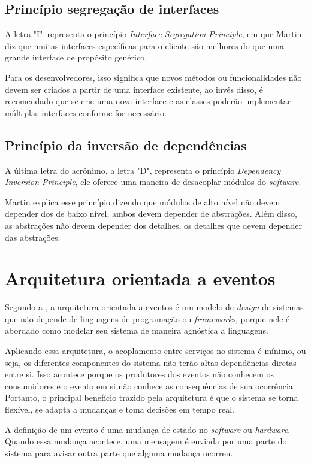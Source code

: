 \subsection{Princípio segregação de interfaces}
A letra "I"\ representa o princípio \textit{Interface Segregation Principle}, em que Martin diz que muitas interfaces específicas para o cliente são melhores do que uma grande interface de propósito genérico.

Para os desenvolvedores, isso significa que novos métodos ou funcionalidades não devem ser criados a partir de uma interface existente, ao invés disso, é recomendado que se crie uma nova interface e as classes poderão implementar múltiplas interfaces conforme for necessário.

\subsection{Princípio da inversão de dependências}\label{sec:D}
A última letra do acrônimo, a letra "D", representa o princípio \textit{Dependency Inversion Principle}, ele oferece uma maneira de desacoplar módulos do \textit{software}.

Martin explica esse princípio dizendo que módulos de alto nível não devem depender dos de baixo nível, ambos devem depender de abstrações. Além disso, as abstrações não devem depender dos detalhes, os detalhes que devem depender das abstrações.

\section{Arquitetura orientada a eventos}\label{sec:eventos}
Segundo a \textcite{redhat}, a arquitetura orientada a eventos é um modelo de \textit{design} de sistemas que não depende de linguagens de programação ou \textit{frameworks}, porque nele é abordado como modelar seu sistema de maneira agnóstica a linguagens.

Aplicando essa arquitetura, o acoplamento entre serviços no sistema é mínimo, ou seja, os diferentes componentes do sistema não terão altas dependências diretas entre si. Isso acontece porque os produtores dos eventos não conhecem os consumidores e o evento em si não conhece as consequências de sua ocorrência. Portanto, o principal benefício trazido pela arquitetura é que o sistema se torna flexível, se adapta a mudanças e toma decisões em tempo real.

A definição de um evento é uma mudança de estado no \textit{software} ou \textit{hardware}. Quando essa mudança acontece, uma mensagem é enviada por uma parte do sistema para avisar outra parte que alguma mudança ocorreu.

